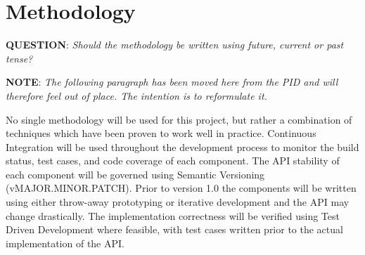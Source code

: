 
\section{Methodology}

\textbf{QUESTION}: \textit{Should the methodology be written using future, current or past tense?}



\textbf{NOTE}: \textit{The following paragraph has been moved here from the PID and will therefore feel out of place. The intention is to reformulate it.}

No single methodology will be used for this project, but rather a combination of techniques which have been proven to work well in practice. Continuous Integration will be used throughout the development process to monitor the build status, test cases, and code coverage of each component. The API stability of each component will be governed using Semantic Versioning (vMAJOR.MINOR.PATCH). Prior to version 1.0 the components will be written using either throw-away prototyping or iterative development and the API may change drastically. The implementation correctness will be verified using Test Driven Development where feasible, with test cases written prior to the actual implementation of the API.





